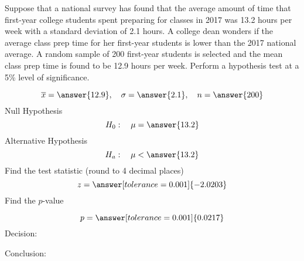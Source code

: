 \documentclass{ximera}
\begin{document}
 
 \begin{problem}\label{prob:140hom9prob1}
Suppose that a national survey has found that the average amount of time that first-year college students spent preparing for classes in 2017 was 13.2 hours per week with a standard deviation of 2.1 hours.  A college dean wonders if the average class prep time for her first-year students is lower than the 2017 national average.  A random sample of 200 first-year students is selected and the mean class prep time is found to be 12.9 hours per week.  Perform a hypothesis test at a 5\% level of significance.

$$\overline{x}=\answer{12.9},\quad \sigma=\answer{2.1},\quad n=\answer{200}$$
Null Hypothesis
$$H_0:\quad \mu=\answer{13.2}$$
Alternative Hypothesis
$$H_a:\quad \mu<\answer{13.2}$$
Find the test statistic (round to 4 decimal places)
$$z=\answer[tolerance=0.001]{-2.0203}$$
Find the $p$-value
\begin{center}  
\end{center}
$$p=\answer[tolerance=0.001]{0.0217}$$
Decision:

\begin{multipleChoice} 
\end{multipleChoice}  

Conclusion:

\begin{multipleChoice} 
\end{multipleChoice} 

\end{problem}
 
\end{document}
